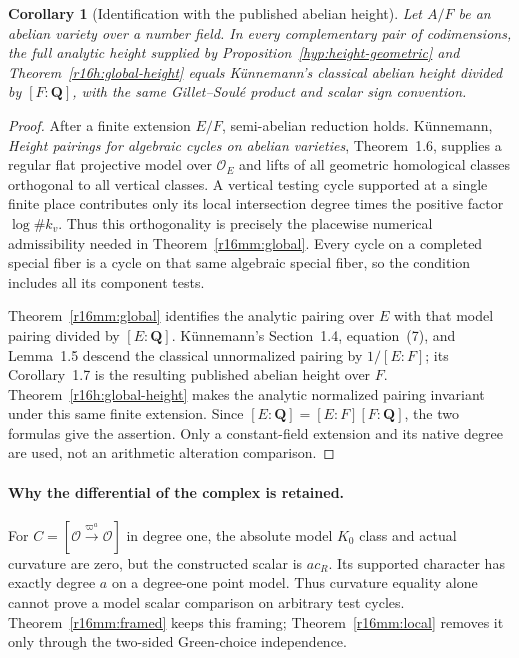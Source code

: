 \documentclass[11pt,a4paper]{article}
\newtheorem{corollary}[theorem]{Corollary}
\theoremstyle{definition}
\theoremstyle{remark}
\numberwithin{equation}{section}
\begin{document}
\begin{corollary}[Identification with the published abelian height]
\label{r16mm:abelian}
Let $A/F$ be an abelian variety over a number field. In every
complementary pair of codimensions, the full analytic height
supplied by Proposition~\ref{hyp:height-geometric} and
Theorem~\ref{r16h:global-height} equals K\"unnemann's classical
abelian height divided by $[F:\mathbf Q]$, with the same
Gillet--Soul\'e product and scalar sign convention.
\end{corollary}

\begin{proof}
After a finite extension $E/F$, semi-abelian reduction holds.
K\"unnemann, \emph{Height pairings for algebraic cycles on abelian
varieties}, Theorem~1.6, supplies a regular flat projective
model over $\mathcal O_E$ and lifts of all geometric homological
classes orthogonal to all vertical classes. A vertical testing
cycle supported at a single finite place contributes only its
local intersection degree times the positive factor
$\log\#k_v$. Thus this orthogonality is precisely the
placewise numerical admissibility needed in
Theorem~\ref{r16mm:global}. Every cycle on a completed special
fiber is a cycle on that same algebraic special fiber, so the
condition includes all its component tests.

Theorem~\ref{r16mm:global} identifies the analytic pairing over
$E$ with that model pairing divided by $[E:\mathbf Q]$.
K\"unnemann's Section~1.4, equation~(7), and Lemma~1.5 descend
the classical unnormalized pairing by $1/[E:F]$; its Corollary~1.7
is the resulting published abelian height over $F$.
Theorem~\ref{r16h:global-height} makes the analytic normalized
pairing invariant under this same finite extension. Since
$[E:\mathbf Q]=[E:F][F:\mathbf Q]$, the two formulas give the
assertion. Only a constant-field extension and its native degree
are used, not an arithmetic alteration comparison.
\end{proof}

\paragraph{Why the differential of the complex is retained.}
For $C=[\mathcal O\xrightarrow{\varpi^a}\mathcal O]$ in degree
one, the absolute model $K_0$ class and actual curvature are
zero, but the constructed scalar is $a c_R$. Its supported
character has exactly degree $a$ on a degree-one point model.
Thus curvature equality alone cannot prove a model scalar
comparison on arbitrary test cycles. Theorem~\ref{r16mm:framed}
keeps this framing; Theorem~\ref{r16mm:local} removes it only
through the two-sided Green-choice independence.
\end{document}
